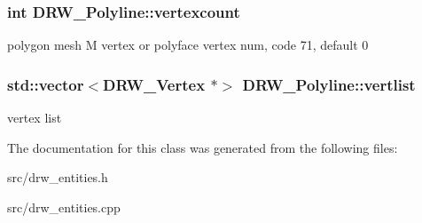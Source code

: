 \subsubsection[{vertexcount}]{\setlength{\rightskip}{0pt plus 5cm}int D\+R\+W\+\_\+\+Polyline\+::vertexcount}\label{class_d_r_w___polyline_ac4bec6f33dd2f8967548d7163525537e}
polygon mesh M vertex or polyface vertex num, code 71, default 0 \hypertarget{class_d_r_w___polyline_ab001a6b7d6fec6298f52cc1f47df6c87}{}
\subsubsection[{vertlist}]{\setlength{\rightskip}{0pt plus 5cm}std\+::vector$<${\bf D\+R\+W\+\_\+\+Vertex} $\ast$$>$ D\+R\+W\+\_\+\+Polyline\+::vertlist}\label{class_d_r_w___polyline_ab001a6b7d6fec6298f52cc1f47df6c87}
vertex list 

The documentation for this class was generated from the following files\+:\begin{DoxyCompactItemize}
\item 
src/drw\+\_\+entities.\+h\item 
src/drw\+\_\+entities.\+cpp\end{DoxyCompactItemize}
